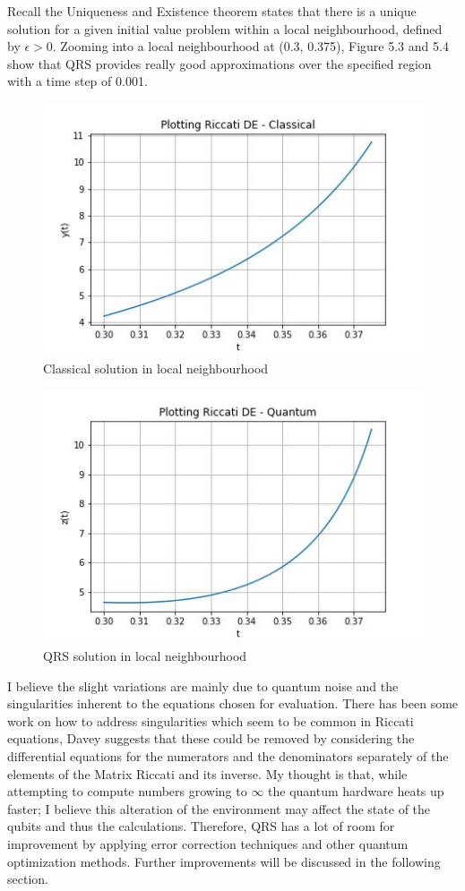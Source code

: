 Recall the Uniqueness and Existence theorem states that there is a unique solution for a given initial value problem within a local neighbourhood, defined by $\epsilon > 0$. Zooming into a local neighbourhood at (0.3, 0.375), Figure 5.3 and 5.4 show that QRS provides really good approximations over the specified region with a time step of 0.001.
\begin{figure}[b]
    \centering
    \includegraphics[scale=0.75]{images/Classical_R2_Zoom.jpg}
    \caption{Classical solution in local neighbourhood}
    \label{fig:my_label}
\end{figure}
\begin{figure}[b]
    \centering
    \includegraphics[scale=0.75]{images/Quantum_R2_Zoom.jpg}
    \caption{QRS solution in local neighbourhood}
    \label{fig:my_label}
\end{figure}

I believe the slight variations are mainly due to quantum noise and the singularities inherent to the equations chosen for evaluation. There has been some work on how to address singularities which seem to be common in Riccati equations, Davey \cite{DAVEY1979137} suggests that these could be removed by considering the differential equations for the numerators and the denominators separately of the elements of the Matrix Riccati and its inverse. My thought is that, while attempting to compute numbers growing to $\infty$ the quantum hardware heats up faster; I believe this alteration of the environment may affect the state of the qubits and thus the calculations. Therefore, QRS has a lot of room for improvement by applying error correction techniques and other quantum optimization methods. Further improvements will be discussed in the following section.
